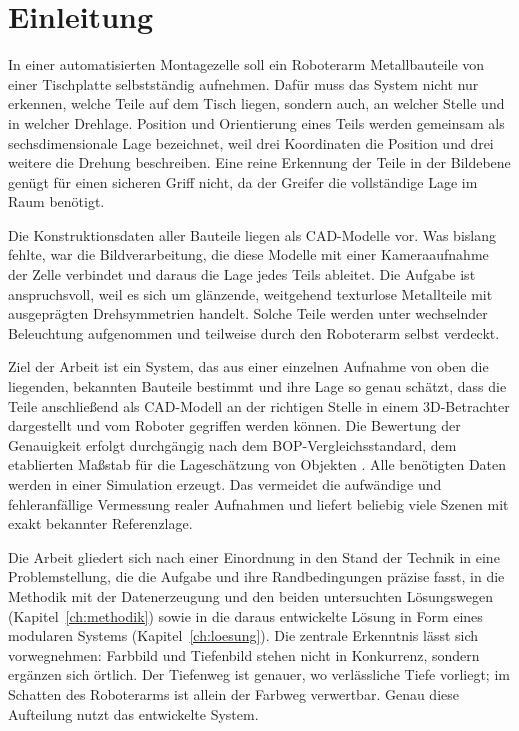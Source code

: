 \documentclass[oneside,studentpaper]{wbk}
\begin{document}
\mainmatter

\chapter{Einleitung}

In einer automatisierten Montagezelle soll ein Roboterarm Metallbauteile von
einer Tischplatte selbstständig aufnehmen. Dafür muss das System nicht nur
erkennen, welche Teile auf dem Tisch liegen, sondern auch, an welcher Stelle und
in welcher Drehlage. Position und Orientierung eines Teils werden gemeinsam als
sechsdimensionale Lage bezeichnet, weil drei Koordinaten die Position und drei
weitere die Drehung beschreiben. Eine reine Erkennung der Teile in der Bildebene
genügt für einen sicheren Griff nicht, da der Greifer die vollständige Lage im
Raum benötigt.

Die Konstruktionsdaten aller Bauteile liegen als CAD-Modelle vor. Was bislang
fehlte, war die Bildverarbeitung, die diese Modelle mit einer Kameraaufnahme der
Zelle verbindet und daraus die Lage jedes Teils ableitet. Die Aufgabe ist
anspruchsvoll, weil es sich um glänzende, weitgehend texturlose Metallteile mit
ausgeprägten Drehsymmetrien handelt. Solche Teile werden unter wechselnder
Beleuchtung aufgenommen und teilweise durch den Roboterarm selbst verdeckt.

Ziel der Arbeit ist ein System, das aus einer einzelnen Aufnahme von oben die
liegenden, bekannten Bauteile bestimmt und ihre Lage so genau schätzt, dass die
Teile anschließend als CAD-Modell an der richtigen Stelle in einem
3D-Betrachter dargestellt und vom Roboter gegriffen werden können. Die Bewertung
der Genauigkeit erfolgt durchgängig nach dem BOP-Vergleichsstandard, dem
etablierten Maßstab für die Lageschätzung von Objekten \cite{bop2024}. Alle
benötigten Daten werden in einer Simulation erzeugt. Das vermeidet die aufwändige
und fehleranfällige Vermessung realer Aufnahmen und liefert beliebig viele Szenen
mit exakt bekannter Referenzlage.

Die Arbeit gliedert sich nach einer Einordnung in den Stand der Technik in eine
Problemstellung, die die Aufgabe und ihre Randbedingungen präzise fasst, in die
Methodik mit der Datenerzeugung und den beiden untersuchten Lösungswegen
(Kapitel~\ref{ch:methodik}) sowie in die daraus entwickelte Lösung in Form eines
modularen Systems (Kapitel~\ref{ch:loesung}). Die zentrale Erkenntnis lässt sich
vorwegnehmen: Farbbild und Tiefenbild stehen nicht in Konkurrenz, sondern
ergänzen sich örtlich. Der Tiefenweg ist genauer, wo verlässliche Tiefe vorliegt;
im Schatten des Roboterarms ist allein der Farbweg verwertbar. Genau diese
Aufteilung nutzt das entwickelte System.
\end{document}
